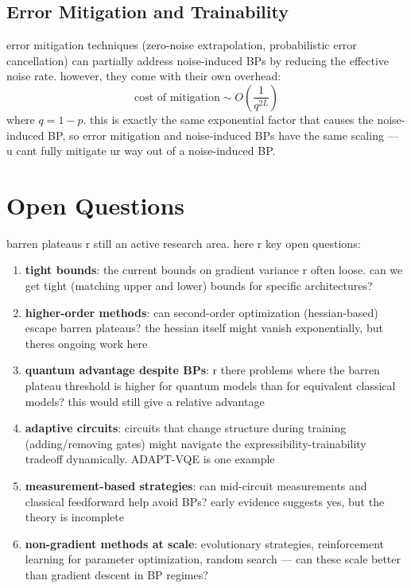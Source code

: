 \documentclass[11pt,a4paper]{article}
\theoremstyle{definition}
\theoremstyle{remark}
\begin{document}
\subsection{Error Mitigation and Trainability}

error mitigation techniques (zero-noise extrapolation, probabilistic error cancellation) can partially address noise-induced BPs by reducing the effective noise rate. however, they come with their own overhead:
\begin{equation}
    \text{cost of mitigation} \sim O\left(\frac{1}{q^{2L}}\right)
\end{equation}
where $q = 1 - p$. this is exactly the same exponential factor that causes the noise-induced BP, so error mitigation and noise-induced BPs have the same scaling --- u cant fully mitigate ur way out of a noise-induced BP.

\section{Open Questions}

barren plateaus r still an active research area. here r key open questions:

\begin{enumerate}[label=\arabic*.]
    \item \textbf{tight bounds}: the current bounds on gradient variance r often loose. can we get tight (matching upper and lower) bounds for specific architectures?

    \item \textbf{higher-order methods}: can second-order optimization (hessian-based) escape barren plateaus? the hessian itself might vanish exponentially, but theres ongoing work here

    \item \textbf{quantum advantage despite BPs}: r there problems where the barren plateau threshold is higher for quantum models than for equivalent classical models? this would still give a relative advantage

    \item \textbf{adaptive circuits}: circuits that change structure during training (adding/removing gates) might navigate the expressibility-trainability tradeoff dynamically. ADAPT-VQE is one example

    \item \textbf{measurement-based strategies}: can mid-circuit measurements and classical feedforward help avoid BPs? early evidence suggests yes, but the theory is incomplete

    \item \textbf{non-gradient methods at scale}: evolutionary strategies, reinforcement learning for parameter optimization, random search --- can these scale better than gradient descent in BP regimes?
\end{enumerate}
\end{document}

